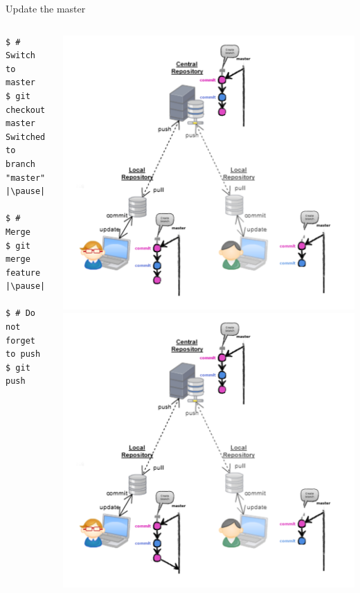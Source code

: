 \begin{frame}[fragile]{Update the master}
\begin{columns}
	\begin{column}{0.4\textwidth}
  	\begin{lstlisting}
$ # Switch to master
$ git checkout master
Switched to branch "master" |\pause|

$ # Merge
$ git merge feature |\pause|

$ # Do not forget to push
$ git push
	\end{lstlisting}
	\end{column}
	\begin{column}{0.6\textwidth}
		\begin{center}
			 {
				\includegraphics[width=.9\textwidth]{multiuser_my_many_commits_pushed.png}
			}\only<2> {
				\includegraphics[width=.9\textwidth]{multiuser_my_merge.png}
}
\end{center}
\end{column}
\end{columns}
\end{frame}
